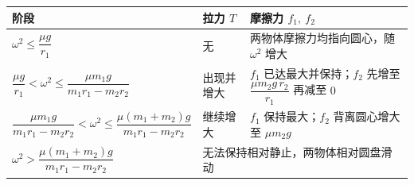 \begin{center}

  \begingroup
  \begin{tabular}{|p{}|p{}|p{}|}
    \hline
    阶段 & 拉力 $T$ & 摩擦力 $f_1,\ f_2$ \\
    \hline
    $\omega^2\leq \dfrac{\mu g}{r_1}$ &
      无 &
      两物体摩擦力均指向圆心，随 $\omega^2$ 增大 \\
    \hline
    $\dfrac{\mu g}{r_1}<\omega^2\leq \dfrac{\mu m_1 g}{m_1 r_1-m_2 r_2}$ &
      出现并增大 &
      $f_1$ 已达最大并保持；$f_2$ 先增至 $\dfrac{\mu m_2 g\,r_2}{r_1}$ 再减至 $0$ \\
    \hline
    $\dfrac{\mu m_1 g}{m_1 r_1-m_2 r_2}<\omega^2\leq \dfrac{\mu(m_1+m_2)g}{m_1 r_1-m_2 r_2}$ &
      继续增大 &
      $f_1$ 保持最大；$f_2$ 背离圆心增大至 $\mu m_2 g$ \\
    \hline
    $\omega^2>\dfrac{\mu(m_1+m_2)g}{m_1 r_1-m_2 r_2}$ &
      \multicolumn{2}{p{0.58\columnwidth}|}{无法保持相对静止，两物体相对圆盘滑动} \\
    \hline
  \end{tabular}
  \endgroup
\end{center}
